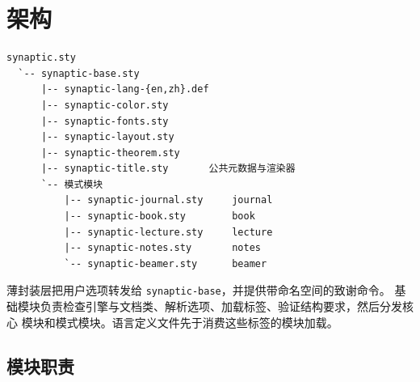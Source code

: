 \documentclass[a4paper,11pt]{scrartcl}
\begin{document}
\SynapticMakeTitle

\section{架构}

\begin{verbatim}
synaptic.sty
  `-- synaptic-base.sty
      |-- synaptic-lang-{en,zh}.def
      |-- synaptic-color.sty
      |-- synaptic-fonts.sty
      |-- synaptic-layout.sty
      |-- synaptic-theorem.sty
      |-- synaptic-title.sty       公共元数据与渲染器
      `-- 模式模块
          |-- synaptic-journal.sty     journal
          |-- synaptic-book.sty        book
          |-- synaptic-lecture.sty     lecture
          |-- synaptic-notes.sty       notes
          `-- synaptic-beamer.sty      beamer
\end{verbatim}

薄封装层把用户选项转发给 \texttt{synaptic-base}，并提供带命名空间的致谢命令。
基础模块负责检查引擎与文档类、解析选项、加载标签、验证结构要求，然后分发核心
模块和模式模块。语言定义文件先于消费这些标签的模块加载。

\subsection{模块职责}

\end{document}
